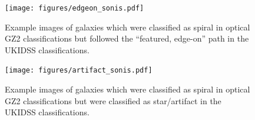  
\begin{figure}
\centering
\texttt{[image: figures/edgeon\_sonis.pdf]}
\caption{Example images of galaxies which were classified as spiral in optical GZ2 classifications but followed the ``featured, edge-on'' path in the UKIDSS classifications.}
\label{fig:edgeon}
\end{figure}

 
\begin{figure}
\centering
\texttt{[image: figures/artifact\_sonis.pdf]}
\caption{Example images of galaxies which were classified as spiral in optical GZ2 classifications but were classified as star/artifact in the UKIDSS classifications.}
\label{fig:artifact}
\end{figure}

